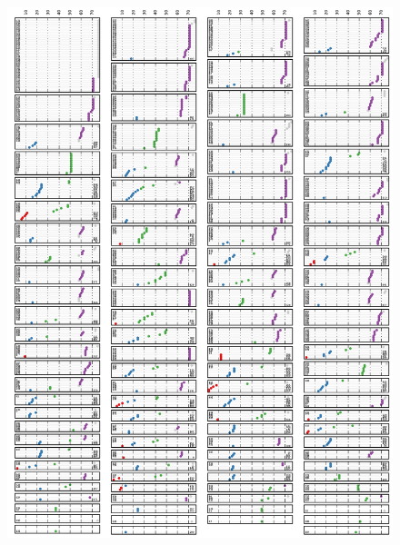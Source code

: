 \documentclass{article}
\begin{document}
\begin{figure}[h!]
  \centering 
    \centerline{\includegraphics[width=6.5in]{mouseretina/retina.1.2.bb.0.0.data-fixed_20_100-anneal_slow_400.truth_latent.pdf}}
  \caption{}
\label{fig:supp:retinabbclusters}
\end{figure}
\end{document}
